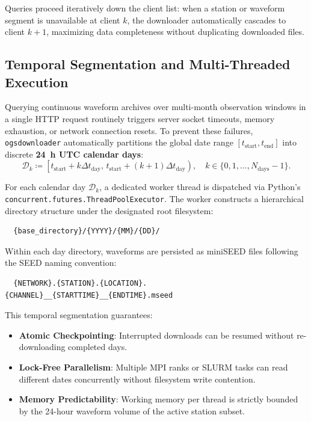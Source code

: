 Queries proceed iteratively down the client list: when a station or
waveform segment is unavailable at client $k$, the downloader
automatically cascades to client $k + 1$, maximizing data completeness
without duplicating downloaded files.

\subsection{Temporal Segmentation and Multi-Threaded Execution}
\label{subsec:temporal_segmentation}

Querying continuous waveform archives over multi-month observation
windows in a single HTTP request routinely triggers server socket
timeouts, memory exhaustion, or network connection resets. To
prevent these failures, \texttt{ogsdownloader} automatically
partitions the global date range $[t_{\mathrm{start}},
t_{\mathrm{end}}]$ into discrete \textbf{\qty{24}{\hour} UTC calendar days}:
\begin{equation}
  \mathcal{D}_k \coloneqq \left[ t_{\mathrm{start}} + k \Delta
    t_{\mathrm{day}},\, t_{\mathrm{start}} + (k + 1) \Delta
  t_{\mathrm{day}} \right), \quad k \in \{0, 1, \dots, N_{\mathrm{days}} - 1\}.
  \label{eq:daily_segmentation}
\end{equation}

For each calendar day $\mathcal{D}_k$, a dedicated worker thread is
dispatched via Python's
\texttt{concurrent.futures.ThreadPoolExecutor}. The worker
constructs a hierarchical directory structure under the designated
root filesystem:
\begin{verbatim}
  {base_directory}/{YYYY}/{MM}/{DD}/
\end{verbatim}
Within each day directory, waveforms are persisted as miniSEED files
following the SEED naming convention:
\begin{verbatim}
  {NETWORK}.{STATION}.{LOCATION}.{CHANNEL}__{STARTTIME}__{ENDTIME}.mseed
\end{verbatim}
This temporal segmentation guarantees:
\begin{itemize}
  \item \textbf{Atomic Checkpointing}: Interrupted downloads can be
    resumed without re-downloading completed days.
  \item \textbf{Lock-Free Parallelism}: Multiple \ac{MPI} ranks or SLURM
    tasks can read different dates concurrently without filesystem
    write contention.
  \item \textbf{Memory Predictability}: Working memory per thread is
    strictly bounded by the 24-hour waveform volume of the active
    station subset.
\end{itemize}

